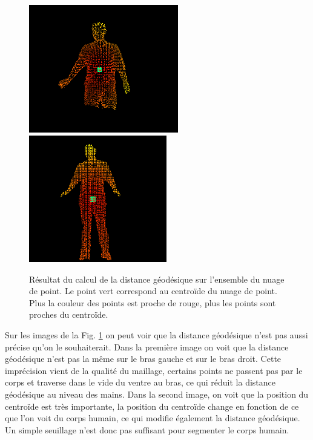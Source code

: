 \begin{figure}[!ht]
  \begin{center}
    \includegraphics[width=6.5cm]{image/geodesic1.PNG}
    \includegraphics[width=6cm]{image/geodesic2.PNG}
    \caption{Résultat du calcul de la distance géodésique sur l'ensemble du nuage de point. Le point vert correspond au centroïde du
    nuage de point. Plus la couleur des points est proche de rouge, plus les points sont proches du centroïde.}
    \label{fig:geodesique}
  \end{center}
\end{figure}

Sur les images de la Fig. \ref{fig:geodesique} on peut voir que la distance géodésique n'est pas aussi précise qu'on le souhaiterait.
Dans la première image on voit que la distance géodésique n'est pas la même sur le bras gauche et sur le bras droit. Cette imprécision
vient de la qualité du maillage, certains points ne passent pas par le corps et traverse dans le vide du ventre au bras, ce qui réduit
la distance géodésique au niveau des mains. Dans la second image, on voit que la position du centroïde est très importante, la position
du centroïde change en fonction de ce que l'on voit du corps humain, ce qui modifie également la distance géodésique. Un simple seuillage
n'est donc pas suffisant pour segmenter le corps humain.

